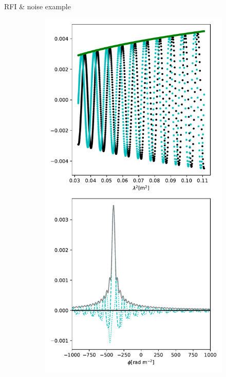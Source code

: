 \documentclass[xetex,aspectratio=169]{beamer}
\begin{document}
\begin{frame}{RFI \& noise example}

	\begin{figure}
		\centering

		\begin{subfigure}{0.2\textwidth}
			\includegraphics[width=\textwidth]{figures/dataset_features/data_normal.pdf}

\end{subfigure}
\end{figure}
\end{frame}
\end{document}
